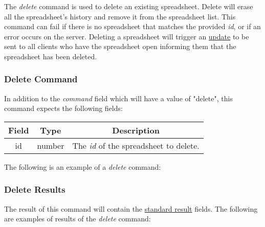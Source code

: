 The \emph{delete} command is used to delete an existing spreadsheet. Delete will 
erase all the spreadsheet’s history and remove it from the spreadsheet list. 
This command can fail if there is no spreadsheet that matches the provided \emph{id}, 
or if an error occurs on the server. Deleting a spreadsheet will trigger an \hyperref[lst:update:delete]{update} 
to be sent to all clients who have the spreadsheet open informing them that 
the spreadsheet has been deleted.

\subsubsection{Delete Command}
In addition to the \emph{command} field which will have a value of "delete", this command expects the following fields:

\begin{table}[H]
    \begin{center}
        \begin{tabular}{|c|c|c|}\hline
            Field & Type & Description \\\hline
            id & number & The \emph{id} of the spreadsheet to delete. \\\hline
        \end{tabular}
    \end{center}
\end{table}

The following is an example of a \emph{delete} command:



\subsubsection{Delete Results}
The result of this command will contain the \hyperref[sec:message:result]{standard result} fields.
The following are examples of results of the \emph{delete} command:





